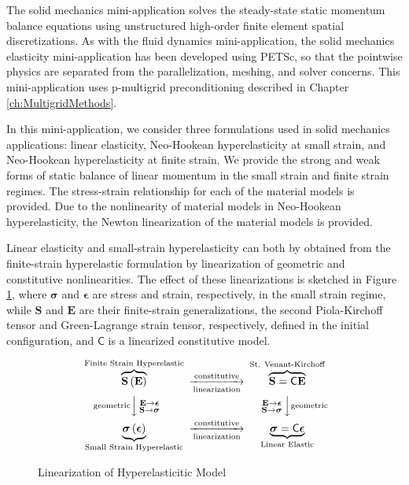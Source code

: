 The solid mechanics mini-application solves the steady-state static momentum balance equations using unstructured high-order finite element spatial discretizations.
As with the fluid dynamics mini-application, the solid mechanics elasticity mini-application has been developed using PETSc, so that the pointwise physics are separated from the parallelization, meshing, and solver concerns.
This mini-application uses p-multigrid preconditioning described in Chapter \ref{ch:MultigridMethods}.

In this mini-application, we consider three formulations used in solid mechanics applications: linear elasticity, Neo-Hookean hyperelasticity at small strain, and Neo-Hookean hyperelasticity at finite strain.
We provide the strong and weak forms of static balance of linear momentum in the small strain and finite strain regimes.
The stress-strain relationship for each of the material models is provided.
Due to the nonlinearity of material models in Neo-Hookean hyperelasticity, the Newton linearization of the material models is provided.

Linear elasticity and small-strain hyperelasticity can both by obtained from the finite-strain hyperelastic formulation by linearization of geometric and constitutive nonlinearities.
The effect of these linearizations is sketched in Figure \ref{fig:hyperelastic-cd}, where $\boldsymbol \sigma$ and $\boldsymbol \epsilon$ are stress and strain, respectively, in the small strain regime, while $\mathbf S$ and $\mathbf E$ are their finite-strain generalizations, the second Piola-Kirchoff tensor and Green-Lagrange strain tensor, respectively, defined in the initial configuration, and $\mathsf C$ is a linearized constitutive model.

\begin{figure}
$$
      \begin{CD}
        {\overbrace{\mathbf S \left( \mathbf E \right)}^{\text{Finite Strain Hyperelastic}}}
        @>{\text{constitutive}}>{\text{linearization}}>
        {\overbrace{\mathbf S = \mathsf C \mathbf E}^{\text{St. Venant-Kirchoff}}} \\
        @V{\text{geometric}}V{\begin{smallmatrix}\mathbf E \to \boldsymbol \epsilon \\ \mathbf S \to \boldsymbol \sigma \end{smallmatrix}}V
        @V{\begin{smallmatrix}\mathbf E \to \boldsymbol \epsilon \\ \mathbf S \to \boldsymbol \sigma \end{smallmatrix}}V{\text{geometric}}V \\
        {\underbrace{\boldsymbol \sigma \left( \boldsymbol \epsilon \right)}_\text{Small Strain Hyperelastic}}
        @>{\text{constitutive}}>\text{linearization}>
        {\underbrace{\boldsymbol \sigma = \mathsf C \boldsymbol \epsilon}_\text{Linear Elastic}}
      \end{CD}
$$
\caption{Linearization of Hyperelasticitic Model}
\label{fig:hyperelastic-cd}
\end{figure}

